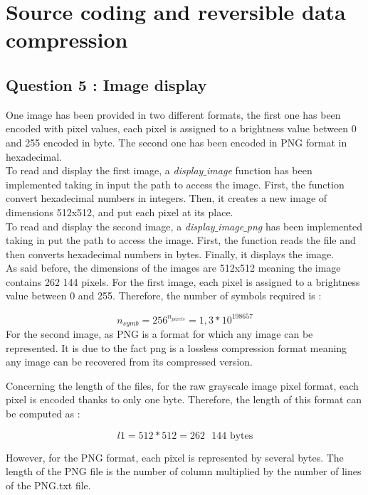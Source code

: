 \documentclass[titlepage]{article}
\begin{document}
\section{Source coding and reversible data compression}
\subsection{Question 5 : Image display}

One image has been provided in two different formats, the first one has been encoded with pixel values, each pixel is assigned to a brightness value between 0 and 255 encoded in byte. The second one has been encoded in PNG format in hexadecimal. \\

To read and display the first image, a \textit{display$\_$image} function has been implemented taking in input the path to access the image. First, the function convert hexadecimal numbers in integers. Then, it creates a new image of dimensions 512x512, and put each pixel at its place. \\

To read and display the second image, a \textit{display$\_$image$\_$png} has been implemented taking in put the path to access the image. First, the function reads the file and then converts hexadecimal numbers in bytes. Finally, it displays the image. \\

As said before, the dimensions of the images are 512x512 meaning the image contains 262 144 pixels. For the first image, each pixel is assigned to a brightness value between 0 and 255. Therefore, the number of symbols required is :

$$ n_{symb} = 256^{n_{pixels}} = 1,3 * 10^{198 657} $$ For the second image, as PNG is a format for which any image can be represented. It is due to the fact png is a lossless compression format meaning any image can be recovered from its compressed version. 

Concerning the length of the files, for the raw grayscale image pixel format, each pixel is encoded thanks to only one byte. Therefore, the length of this format can be computed as :

$$l1 = 512*512 = 262\text{ } 144 \text{ bytes}$$ 

However, for the PNG format, each pixel is represented by several bytes. The length of the PNG file is the number of column multiplied by the number of lines of the PNG.txt file. 
\end{document}
